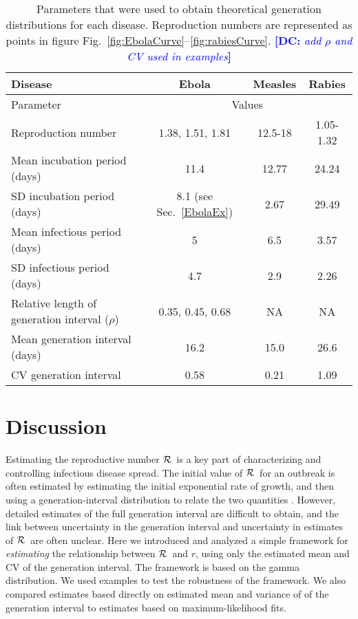 \documentclass[12pt]{article}
\newcommand{\RR}{\ensuremath{{\cal R}}}
\newcommand{\sref}[1]{Sec.~\ref{#1}}
\newcommand{\frange}[2]{Fig.~\ref{fig:#1}--\ref{fig:#2}}
\newcommand{\tlab}[1]{\label{tab:#1}}
\newcommand{\comment}[3]{\textcolor{#1}{\textbf{[#2: }\textit{#3}\textbf{]}}}
\newcommand{\dc}[1]{\comment{blue}{DC}{#1}}
\begin{document}
\begin{table}[h!]
\centering
\tiny
\begin{tabular}{l*{3}{c}}
\hline
Disease & Ebola & Measles & Rabies\\
\hline
Parameter & \multicolumn{3}{c}{Values}\\
\hline
Reproduction number & 1.38, 1.51, 1.81 \cite{AylwBarb14} & 12.5-18 \cite{anderson1982directly} & 1.05-1.32 \cite{HampDush09} \\
Mean incubation period (days) & 11.4 \cite{AylwBarb14} & 12.77 \cite{LessReic09}  & 24.24 \cite{HampDush09} \\
SD incubation period (days) & 8.1 (see \sref{EbolaEx}) & 2.67 \cite{LessReic09} & 29.49 \cite{HampDush09} \\
Mean infectious period (days) & 5 \cite{AylwBarb14} & 6.5 \cite{anderson1982directly} & 3.57 \cite{HampDush09} \\
SD infectious period (days) & 4.7 \cite{AylwBarb14} & 2.9 \cite{Lloy01} & 2.26 \cite{HampDush09}\\
\hline
Relative length of generation interval ($\rho$) & 0.35, 0.45, 0.68 \cite{AylwBarb14} & NA & NA \\
\hline
Mean generation interval (days) & 16.2 & 15.0 & 26.6 \\
CV generation interval & 0.58 & 0.21 & 1.09
\end{tabular}
\caption{Parameters that were used to obtain theoretical generation distributions for each disease. Reproduction numbers are represented as points in figure \frange{EbolaCurve}{rabiesCurve}. \dc{add $\rho$ and CV used in examples}}
\tlab{parameters}
\end{table}


\section{Discussion}

Estimating the reproductive number \RR\ is a key part of characterizing and controlling infectious disease spread. The initial value of \RR\ for an outbreak is often estimated by estimating the initial exponential rate of growth, and then using a generation-interval distribution to relate the two quantities \cite{WallLips07,Sven07,Nish10,Sven15}.
However, detailed estimates of the full generation interval are difficult to obtain, and the link between uncertainty in the generation interval and uncertainty in estimates of \RR\ are often unclear.
Here we introduced and analyzed a simple framework for \emph{estimating} the relationship between \RR\ and $r$, using only the estimated mean and CV of the generation interval. The framework is based on the gamma distribution. We used examples to test the robustness of the framework. We also compared estimates based directly on estimated mean and variance of of the generation interval to estimates based on maximum-likelihood fits.
\end{document}
